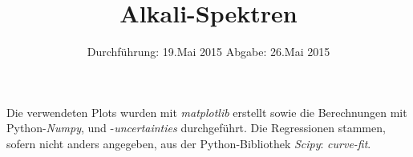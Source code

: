 
\subject{Anfängerpraktikum V605}
\title{Alkali-Spektren}
\date{
  Durchführung: 19.Mai 2015
  \hspace{3em}
  Abgabe: 26.Mai 2015
}


\maketitle
\newpage








\printbibliography
\noindent Die verwendeten Plots wurden mit \textit{matplotlib}\cite{matplotlib} erstellt sowie die Berechnungen mit Python-\textit{Numpy}\cite{numpy}, und -\textit{uncertainties}\cite{uncertainties} durchgeführt.
Die Regressionen stammen, sofern nicht anders angegeben, aus der Python-Bibliothek \textit{Scipy}\cite{scipy}: \emph{curve-fit}.

